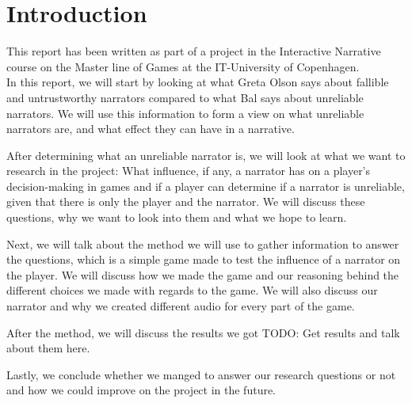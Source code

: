 \section{Introduction}
\label{Introduction}

This report has been written as part of a project in the Interactive Narrative course on the Master line of Games at the IT-University of Copenhagen.\\

In this report, we will start by looking at what Greta Olson says about fallible and untrustworthy narrators compared to what Bal says about unreliable narrators. We will use this information to form a view on what unreliable narrators are, and what effect they can have in a narrative.

After determining what an unreliable narrator is, we will look at what we want to research in the project: What influence, if any, a narrator has on a player's decision-making in games and if a player can determine if a narrator is unreliable, given that there is only the player and the narrator. We will discuss these questions, why we want to look into them and what we hope to learn.

Next, we will talk about the method we will use to gather information to answer the questions, which is a simple game made to test the influence of a narrator on the player. We will discuss how we made the game and our reasoning behind the different choices we made with regards to the game. We will also discuss our narrator and why we created different audio for every part of the game.

After the method, we will discuss the results we got TODO: Get results and talk about them here.

Lastly, we conclude whether we manged to answer our research questions or not and how we could improve on the project in the future.

%
%
%
%
